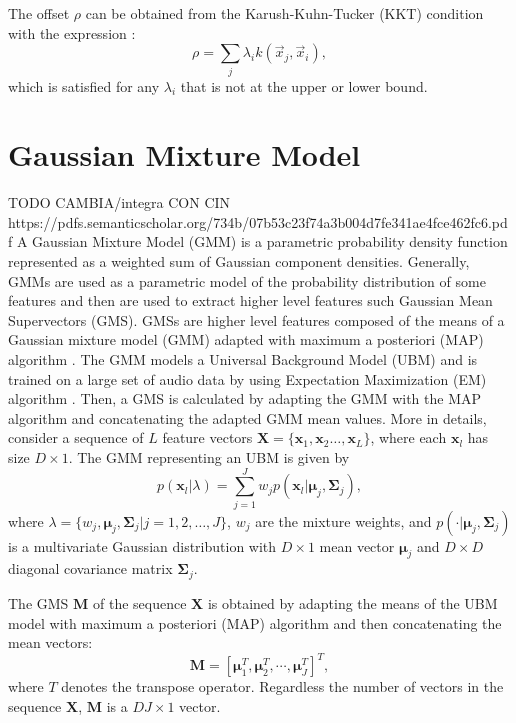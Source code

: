 The offset $\rho$ can be obtained from the Karush-Kuhn-Tucker (KKT) condition with the expression \cite{boyd2004convex}:
\begin{equation}
\rho = \sum_j \lambda_i k(\vec{x}_j,\vec{x}_i),
\end{equation}
which is satisfied for any $\lambda_i$ that is not at the upper or lower bound.



\section{Gaussian Mixture Model} TODO CAMBIA/integra CON CIN
https://pdfs.semanticscholar.org/734b/07b53c23f74a3b004d7fe341ae4fce462fc6.pdf
A Gaussian Mixture Model (GMM) is a parametric probability density function represented as a weighted sum of Gaussian component densities. Generally, GMMs are used as a parametric model of the probability distribution of some features and then are used to extract higher level features such Gaussian Mean Supervectors (GMS). GMSs are higher level features composed of the means of a Gaussian mixture model (GMM) adapted with maximum a posteriori (MAP) algorithm \cite{Kinnunen10,Campbell2006}. The GMM models a Universal Background Model (UBM) and is trained on a large set of audio data by using Expectation Maximization (EM) algorithm \cite{bilmes1998gentle}. Then, a GMS is calculated by adapting the GMM with the MAP algorithm \cite{Reynolds10} and concatenating the adapted GMM mean values.
More in details, consider a sequence of  $L$ feature vectors $\mathbf{X}=\{\mathbf{x}_1,\mathbf{x}_2\ldots,\mathbf{x}_L\}$, where each $\mathbf{x}_l$  has size $D\times 1$. The GMM representing an UBM is given by
\begin{equation}\label{eq:ubm}
p(\mathbf{x}_l|\lambda) = \sum_{j=1}^{J}w_j p(\mathbf{x}_l|\boldsymbol{\mu}_j,\boldsymbol{\Sigma}_j),
\end{equation}
where $\lambda=\{w_j,\boldsymbol{\mu}_j,\boldsymbol{\Sigma}_j | j=1,2,\ldots,J\}$, $w_j$ are the mixture weights, and $p(\cdot|\boldsymbol{\mu}_j,\boldsymbol{\Sigma}_j)$ is a multivariate Gaussian distribution with $D\times 1$ mean vector $\boldsymbol{\mu}_j$ and $D \times D$ diagonal covariance matrix $\boldsymbol{\Sigma}_j$.

The GMS $\mathbf{M}$ of the sequence $\mathbf{X}$ is obtained by adapting the means of the UBM model with maximum a posteriori (MAP) algorithm and then concatenating the mean vectors: 
\begin{equation}
\mathbf{M} = [\boldsymbol{\mu}_1^T,\boldsymbol{\mu}_2^T,\cdots,\boldsymbol{\mu}_J^T]^T,
\end{equation}
where $T$ denotes the transpose operator. Regardless the number of vectors in the sequence $\mathbf{X}$, $\mathbf{M}$ is a $DJ\times 1$ vector.


